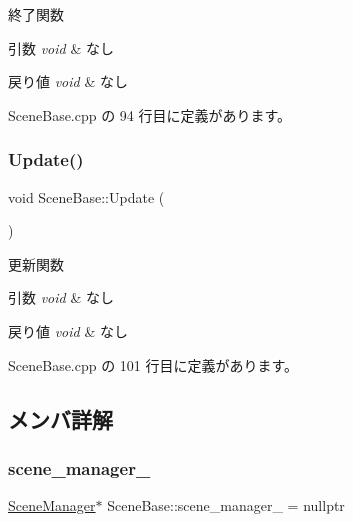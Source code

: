 終了関数 


\begin{DoxyParams}{引数}
{\em void} & なし \\
\hline
\end{DoxyParams}

\begin{DoxyRetVals}{戻り値}
{\em void} & なし \\
\hline
\end{DoxyRetVals}


 Scene\+Base.\+cpp の 94 行目に定義があります。

\mbox{\label{class_scene_base_a71f332a32d99548b3aa912210a2dd0b0}} 
\subsubsection{\texorpdfstring{Update()}{Update()}}
{\footnotesize\ttfamily void Scene\+Base\+::\+Update (\begin{DoxyParamCaption}{ }\end{DoxyParamCaption})}



更新関数 


\begin{DoxyParams}{引数}
{\em void} & なし \\
\hline
\end{DoxyParams}

\begin{DoxyRetVals}{戻り値}
{\em void} & なし \\
\hline
\end{DoxyRetVals}


 Scene\+Base.\+cpp の 101 行目に定義があります。



\subsection{メンバ詳解}
\mbox{\label{class_scene_base_af9f693449ce2472d28f692bd64d5c2ef}} 
\subsubsection{\texorpdfstring{scene\+\_\+manager\+\_\+}{scene\_manager\_}}
{\footnotesize\ttfamily \mbox{\hyperlink{class_scene_manager}{Scene\+Manager}}$\ast$ Scene\+Base\+::scene\+\_\+manager\+\_\+ = nullptr\hspace{0.3cm}{\ttfamily [private]}}



